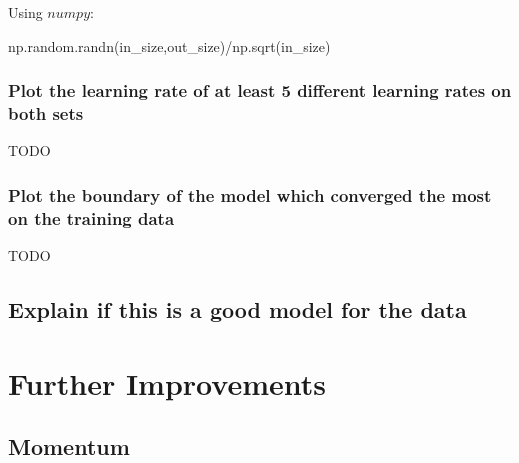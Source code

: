 \documentclass[11pt]{article}
\begin{document}
Using $numpy$:
\begin{python}
np.random.randn(in\_size,out\_size)/np.sqrt(in\_size)
\end{python}
\subsubsection{Plot the learning rate of at least 5 different learning rates on both sets}
TODO
\subsubsection{Plot the boundary of the model which converged the most on the training data}
TODO
\subsection{Explain if this is a good model for the data}

\section{Further Improvements}
\subsection{Momentum}
\end{document}
